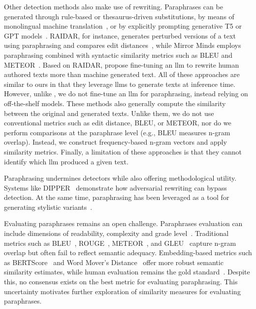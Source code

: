Other detection methods also make use of rewriting. 
Paraphrases can be generated through rule-based or thesaurus-driven substitutions, by means of monolingual machine translation~\citep{zhou_paraphrase_2021}, or by explicitly prompting generative T5 or GPT models~\citep{kurt_pehlivanoglu_comparative_2024}.
RAIDAR, for instance, generates perturbed versions of a text using paraphrasing and compares edit distances~\citep{mao_raidar_2024}, while Mirror Minds employs paraphrasing combined with syntactic similarity metrics such as BLEU and METEOR~\citep{baradia_mirror_2025}. 
Based on RAIDAR, \citet{li_learning_2025} propose fine-tuning an \ac{llm} to rewrite human authored texts more than machine generated text.
All of these approaches are similar to ours in that they leverage \acp{llm} to generate texts at inference time. 
However, unlike \citet{li_learning_2025}, we do not fine-tune an \ac{llm} for paraphrasing, instead relying on off-the-shelf models.
These methods also generally compute the similarity between the original and generated texts. 
Unlike them, we do not use conventional metrics such as edit distance, BLEU, or METEOR, nor do we perform comparisons at the paraphrase level (e.g., BLEU measures n-gram overlap). 
Instead, we construct frequency-based n-gram vectors and apply similarity metrics.
Finally, a limitation of these approaches is that they cannot identify which \ac{llm} produced a given text.

Paraphrasing undermines detectors while also offering methodological utility. 
Systems like DIPPER~\citep{Krishna_dipper_2023} demonstrate how adversarial rewriting can bypass detection. 
At the same time, paraphrasing has been leveraged as a tool for generating stylistic variants~\citep{mao_raidar_2024,baradia_mirror_2025}.

Evaluating paraphrases remains an open challenge. 
Paraphrases evaluation can include dimensions of readability, complexity and grade level~\citep{Thomas_cross_topic_24}.
Traditional metrics such as BLEU~\citep{papineni_bleu_2001}, ROUGE~\citep{lin_rouge_2004}, METEOR~\citep{banerjee_METEOR_2005}, and GLEU~\citep{kurt_pehlivanoglu_comparative_2024} capture n-gram overlap but often fail to reflect semantic adequacy. 
Embedding-based metrics such as BERTScore~\citep{hanna_fine_grained_2021} and Word Mover's Distance~\citep{gohsen_captions_2023} offer more robust semantic similarity estimates, while human evaluation remains the gold standard~\citep{zhou_paraphrase_2021}. 
Despite this, no consensus exists on the best metric for evaluating paraphrasing. 
This uncertainty motivates further exploration of similarity measures for evaluating paraphrases.



